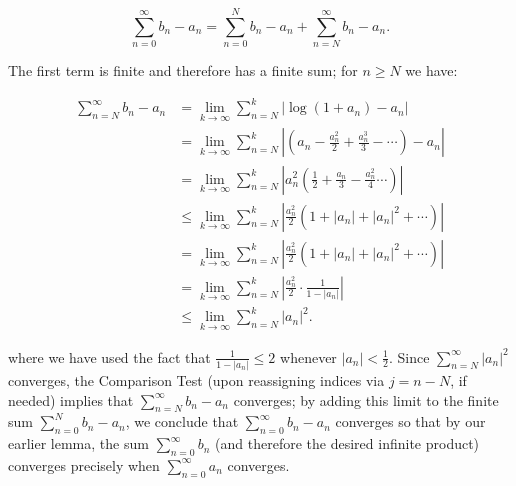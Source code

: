 \begin{solution}
  $$
  \sum_{n=0}^{\infty} b_n - a_n = \sum_{n=0}^{N} b_n - a_n + \sum_{n=N}^{\infty} b_n - a_n.
  $$

  \pagebreak
  The first term is finite and therefore has a finite sum; for $n \ge N$ we have:

  \begin{align*}
    \sum_{n=N}^{\infty} b_n - a_n
      &= \lim_{k \to \infty} \sum\limits_{n=N}^{k} \left| \log(1 + a_n) - a_n \right| \\
      &= \lim_{k \to \infty} \sum\limits_{n=N}^{k} \left| \left(a_n - \frac{a_n^2}{2} + \frac{a_n^3}{3} - \cdots\right) - a_n \right| \\
      &= \lim_{k \to \infty} \sum\limits_{n=N}^{k} \left| a_n^2 \left(\frac{1}{2} + \frac{a_n}{3} - \frac{a_n^2}{4} \cdots \right) \right| \\
      &\le \lim_{k \to \infty} \sum\limits_{n=N}^{k} \left| \frac{a_n^2}{2} \left(1 + |a_n| + |a_n|^2 + \cdots \right) \right| \\
      &= \lim_{k \to \infty} \sum\limits_{n=N}^{k} \left| \frac{a_n^2}{2} \left(1 + |a_n| + |a_n|^2 + \cdots \right) \right| \\
      &= \lim_{k \to \infty} \sum\limits_{n=N}^{k} \left| \frac{a_n^2}{2} \cdot \frac{1}{1 - |a_n|} \right| \\
      &\le \lim_{k \to \infty} \sum\limits_{n=N}^{k} \left| a_n \right|^2.
  \end{align*}

  where we have used the fact that $\frac{1}{1 - |a_n|} \le 2$ whenever $|a_n| < \frac{1}{2}$. Since 
  $\sum\limits_{n=N}^{\infty} \left| a_n \right|^2$ converges, the Comparison Test (upon reassigning indices via 
  $j = n - N$, if needed) implies that $\sum\limits_{n=N}^{\infty} b_n - a_n$ converges; by adding this limit to the 
  finite sum $\sum\limits_{n=0}^{N} b_n - a_n$, we conclude that $\sum\limits_{n=0}^{\infty} b_n - a_n$ converges so 
  that by our earlier lemma, the sum $\sum\limits_{n=0}^{\infty} b_n$ (and therefore the desired infinite product) 
  converges precisely when $\sum\limits_{n=0}^{\infty} a_n$ converges.
  \ \\
\end{solution}